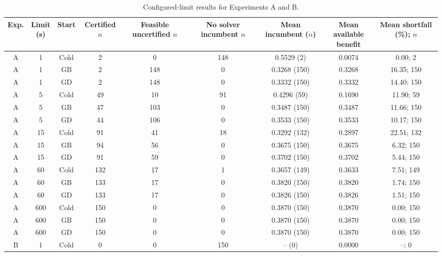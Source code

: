 \begin{table}[!htbp]
\centering
\caption{Configured-limit results for Experiments A and B.}
\label{tab:AB-budget-status}
\scriptsize
\setlength{\tabcolsep}{3.1pt}
\renewcommand{\arraystretch}{1.08}
\begin{tabular}{@{}ccccccccc@{}}
\toprule
Exp. & \makecell{Limit\\(s)} & Start & \makecell{Certified\\$n$} & \makecell{Feasible\\uncertified $n$} & \makecell{No solver\\incumbent $n$} & \makecell{Mean incumbent\\($n$)} & \makecell{Mean available\\benefit} & \makecell{Mean shortfall\\(\%); $n$} \\
\midrule
A & 1 & Cold & 2 & 0 & 148 & 0.5529 (2) & 0.0074 & 0.00; 2 \\
A & 1 & GB & 2 & 148 & 0 & 0.3268 (150) & 0.3268 & 16.35; 150 \\
A & 1 & GD & 2 & 148 & 0 & 0.3332 (150) & 0.3332 & 14.40; 150 \\
A & 5 & Cold & 49 & 10 & 91 & 0.4296 (59) & 0.1690 & 11.90; 59 \\
A & 5 & GB & 47 & 103 & 0 & 0.3487 (150) & 0.3487 & 11.66; 150 \\
A & 5 & GD & 44 & 106 & 0 & 0.3533 (150) & 0.3533 & 10.17; 150 \\
A & 15 & Cold & 91 & 41 & 18 & 0.3292 (132) & 0.2897 & 22.51; 132 \\
A & 15 & GB & 94 & 56 & 0 & 0.3675 (150) & 0.3675 & 6.32; 150 \\
A & 15 & GD & 91 & 59 & 0 & 0.3702 (150) & 0.3702 & 5.44; 150 \\
A & 60 & Cold & 132 & 17 & 1 & 0.3657 (149) & 0.3633 & 7.51; 149 \\
A & 60 & GB & 133 & 17 & 0 & 0.3820 (150) & 0.3820 & 1.74; 150 \\
A & 60 & GD & 133 & 17 & 0 & 0.3826 (150) & 0.3826 & 1.51; 150 \\
A & 600 & Cold & 150 & 0 & 0 & 0.3870 (150) & 0.3870 & 0.00; 150 \\
A & 600 & GB & 150 & 0 & 0 & 0.3870 (150) & 0.3870 & 0.00; 150 \\
A & 600 & GD & 150 & 0 & 0 & 0.3870 (150) & 0.3870 & 0.00; 150 \\
\midrule
B & 1 & Cold & 0 & 0 & 150 & -- (0) & 0.0000 & --; 0 \\

\end{tabular}
\end{table}
